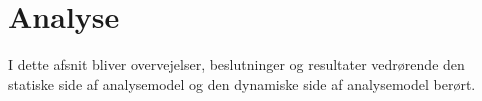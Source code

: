 \section{Analyse}
I dette afsnit bliver overvejelser, beslutninger og resultater vedrørende den statiske side af analysemodel og den dynamiske side af analysemodel berørt. 


\newpage


\newpages